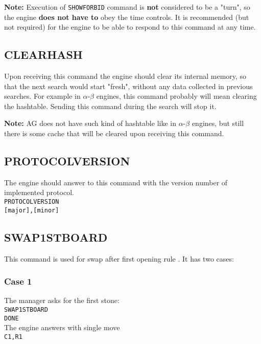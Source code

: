 \documentclass[12pt,a4paper]{article}
\begin{document}
\textbf{Note:} Execution of \texttt{SHOWFORBID} command is \textbf{not} considered to be a "turn", so the engine \textbf{does not have to} obey the time controls. It is recommended (but not required) for the engine to be able to respond to this command at any time.


\subsection{CLEARHASH}
\label{cmd_clearhash}
Upon receiving this command the engine should clear its internal memory, so that the next search would start "fresh", without any data collected in previous searches. For example in $\alpha$-$\beta$ engines, this command probably will mean clearing the hashtable. Sending this command during the search will stop it.

\textbf{Note:} AG does not have such kind of hashtable like in $\alpha$-$\beta$ engines, but still there is some cache that will be cleared upon receiving this command.


\subsection{PROTOCOLVERSION}
\label{cmd_protocol_version}
The engine should answer to this command with the version number of implemented protocol.\\
\texttt{PROTOCOLVERSION} \\
\texttt{[major],[minor]} \\


\newpage
\subsection{SWAP1STBOARD}
\label{cmd_swap1st}
This command is used for swap after first opening rule \cite{renju_opening_rules}. It has two cases:

\subsubsection{Case 1}
The manager asks for the first stone:\\
\texttt{SWAP1STBOARD}\\
\texttt{DONE}\\
The engine answers with single move\\
\texttt{C1,R1}
\end{document}

